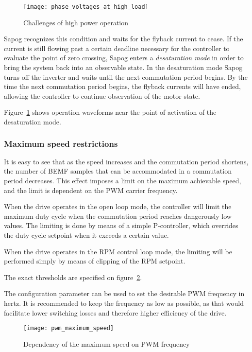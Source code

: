 \documentclass{zubaxdoc}
\begin{document}
\begin{figure}[hbtp]
    \centering
    \texttt{[image: phase\_voltages\_at\_high\_load]}
    \caption{Challenges of high power operation
    \label{phase_voltages_at_high_load}}
\end{figure}

Sapog recognizes this condition and waits for the flyback current to cease.
If the current is still flowing past a certain deadline necessary for the controller to evaluate the
point of zero crossing, Sapog enters a \emph{desaturation mode} in order to bring the system
back into an observable state.
In the desaturation mode Sapog turns off the inverter and waits until the next commutation period begins.
By the time the next commutation period begins, the flyback currents will have ended,
allowing the controller to continue observation of the motor state.

Figure~\ref{phase_voltages_at_high_load} shows operation waveforms near the point of activation
of the desaturation mode.

\subsubsection{Maximum speed restrictions}

It is easy to see that as the speed increases and the commutation period shortens,
the number of BEMF samples that can be accommodated in a commutation period decreases.
This effect imposes a limit on the maximum achievable speed,
and the limit is dependent on the PWM carrier frequency.

When the drive operates in the open loop mode, the controller will limit the maximum duty cycle
when the commutation period reaches dangerously low values.
The limiting is done by means of a simple P-controller,
which overrides the duty cycle setpoint when it exceeds a certain value.

When the drive operates in the RPM control loop mode, the limiting will be performed simply by means of
clipping of the RPM setpoint.

The exact thresholds are specified on figure~\ref{pwm_maximum_speed}.

The configuration parameter  can be used to set the desirable PWM frequency
in hertz.
It is recommended to keep the frequency as low as possible,
as that would facilitate lower switching losses and therefore higher efficiency of the drive.

\begin{figure}[hbt]
    \centering
    \texttt{[image: pwm\_maximum\_speed]}
    \caption{Dependency of the maximum speed on PWM frequency
    \label{pwm_maximum_speed}}
\end{figure}
\end{document}
